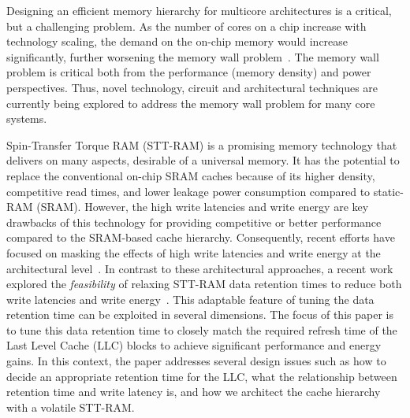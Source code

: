 
Designing an efficient memory hierarchy for multicore architectures is a critical, but a challenging
problem. As the number of cores on a chip increase with technology scaling, the demand on the on-chip
memory would increase significantly, further worsening the memory wall problem~\cite{BurgerGK96}. The
memory wall problem is critical both from the performance (memory density) and power perspectives.
Thus, novel technology, circuit and architectural techniques are currently being explored to address
the memory wall problem for many core systems.





Spin-Transfer Torque RAM (STT-RAM) is a promising memory technology that delivers on many aspects,
desirable of a universal memory. It has the potential to replace the conventional on-chip SRAM
caches because of its higher density, competitive read times, and lower leakage power consumption
compared to static-RAM (SRAM). However, the high write latencies and write energy are key drawbacks
of this technology for providing competitive or better performance compared to the SRAM-based cache
hierarchy. Consequently, recent efforts have focused on masking the effects of high write latencies
and write energy at the architectural level~\cite{mram-energy-reduction,gsun-hpca}. In contrast to
these architectural approaches, a recent  work explored the {\it feasibility} of relaxing STT-RAM
data retention times to reduce both write latencies and write energy~\cite{STTRAM:HPCA11}. This
adaptable feature of tuning the data retention time can be exploited in several dimensions. The focus
of this paper is to tune this data retention time to closely match the required refresh time of the Last
Level Cache (LLC) blocks to achieve significant performance and energy gains. In this context, the paper
addresses several design issues such as how to decide an appropriate retention time for the LLC, 
what the relationship between retention time and write latency is, and how we
architect the cache hierarchy with a volatile STT-RAM.

